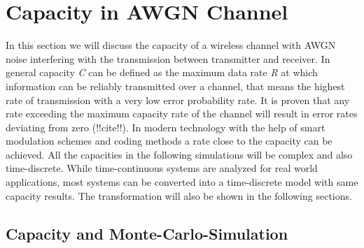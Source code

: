 \chapter{Capacity in AWGN Channel} \label{chap:awgnchan}
\graphicspath{{C:/Users/Kevin/Bachelarbeit/Bachelorarbeit/01_Bachelorarbeit_LaTex/02_Figures/}}

In this section we will discuss the capacity of a wireless channel with \gls{AWGN} noise interfering with the transmission between transmitter and receiver. 
\newline
In general capacity \textit{C} can be defined as the maximum data rate \textit{R} at which information can be reliably transmitted over a channel, that means the highest rate of transmission with a very low error probability rate. It is proven that any rate exceeding the maximum capacity rate of the channel will result in error rates deviating from zero (!!cite!!). In modern technology with the help of smart modulation schemes and coding methods a rate close to the capacity can be achieved. 
All the capacities in the following simulations will be complex and also time-discrete. While time-continuous systems are analyzed for real world applications, most systems can be converted into a time-discrete model with same capacity results. The transformation will also be shown in the following sections. 
\section{Capacity and Monte-Carlo-Simulation}
\label{sec:capAWGN}

